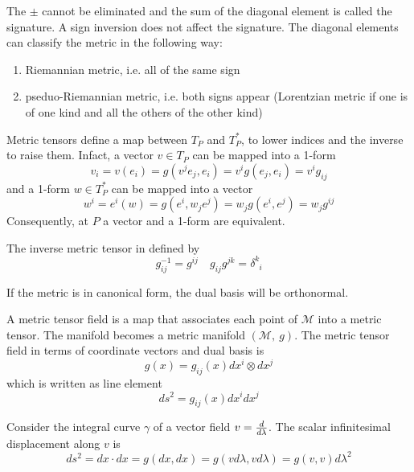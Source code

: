     The $\pm$ cannot be eliminated and the sum of the diagonal element is called the signature. A sign inversion does not affect the signature. The diagonal elements can classify the metric in the following way:
    \begin{enumerate}
        \item Riemannian metric, i.e. all of the same sign
        \item pseduo-Riemannian metric, i.e. both signs appear (Lorentzian metric if one is of one kind and all the others of the other kind)
    \end{enumerate}

    Metric tensors define a map between $T_P$ and $T^*_P$, to lower indices and the inverse to raise them. Infact, a vector $v \in T_P$ can be mapped into a 1-form
    \begin{equation*}
        v_i = v(e_i) = g(v^j e_j, e_i) = v^i g(e_j, e_i) = v^i g_{ij}
    \end{equation*}
    and a 1-form $w \in T^*_P$ can be mapped into a vector 
    \begin{equation*}
        w^i = e^i(w) = g(e^i, w_j e^j) = w_j g(e^i, e^j) = w_j g^{ij}
    \end{equation*}
    Consequently, at $P$ a vector and a 1-form are equivalent.

    
    The inverse metric tensor in defined by 
    \begin{equation*}
        g^{-1}_{ij} = g^{ij} \quad g_{ij} g^{jk} = \delta^k_{\phantom k i}
    \end{equation*}

    If the metric is in canonical form, the dual basis will be orthonormal. 

    A metric tensor field is a map that associates each point of $\mathcal M$ into a metric tensor. The manifold becomes a metric manifold $(\mathcal M, ~g)$. The metric tensor field in terms of coordinate vectors and dual basis is 
    \begin{equation*}
        g(x) = g_{ij}(x) dx^i \otimes dx^j
    \end{equation*}
    which is written as line element
    \begin{equation*}
        ds^2 = g_{ij}(x) dx^i dx^j
    \end{equation*}

    Consider the integral curve $\gamma$ of a vector field $v = \frac{d}{d\lambda}$. The scalar infinitesimal displacement along $v$ is 
    \begin{equation*}
        ds^2 = dx \cdot dx = g(dx, dx) = g(v d\lambda, v d\lambda) = g(v,v) d\lambda^2
    \end{equation*}


